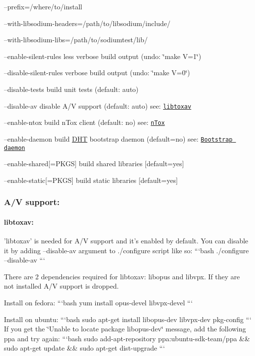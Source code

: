 \begin{DoxyItemize}
\item --prefix=/where/to/install
\item --with-\/libsodium-\/headers=/path/to/libsodium/include/
\item --with-\/libsodium-\/libs=/path/to/sodiumtest/lib/
\item --enable-\/silent-\/rules less verbose build output (undo\+: \char`\"{}make V=1\char`\"{})
\item --disable-\/silent-\/rules verbose build output (undo\+: \char`\"{}make V=0\char`\"{})
\item --disable-\/tests build unit tests (default\+: auto)
\item --disable-\/av disable A/\+V support (default\+: auto) see\+: \href{#libtoxav}{\tt libtoxav}
\item --enable-\/ntox build n\+Tox client (default\+: no) see\+: \href{#ntox}{\tt n\+Tox}
\item --enable-\/daemon build \hyperlink{struct_d_h_t}{D\+H\+T} bootstrap daemon (default=no) see\+: \href{#bootstrapd}{\tt Bootstrap daemon}
\item --enable-\/shared\mbox{[}=P\+K\+G\+S\mbox{]} build shared libraries \mbox{[}default=yes\mbox{]}
\item --enable-\/static\mbox{[}=P\+K\+G\+S\mbox{]} build static libraries \mbox{[}default=yes\mbox{]}
\end{DoxyItemize}

\label{_av}%
 \subsubsection*{A/\+V support\+:}

\label{_libtoxav}%
 \paragraph*{libtoxav\+:}

'libtoxav' is needed for A/\+V support and it's enabled by default. You can disable it by adding --disable-\/av argument to ./configure script like so\+: ```bash ./configure --disable-\/av ```

There are 2 dependencies required for libtoxav\+: libopus and libvpx. If they are not installed A/\+V support is dropped.

Install on fedora\+: ```bash yum install opus-\/devel libvpx-\/devel ```

Install on ubuntu\+: ```bash sudo apt-\/get install libopus-\/dev libvpx-\/dev pkg-\/config ``` If you get the \char`\"{}\+Unable to locate package libopus-\/dev\char`\"{} message, add the following ppa and try again\+: ```bash sudo add-\/apt-\/repository ppa\+:ubuntu-\/sdk-\/team/ppa \&\& sudo apt-\/get update \&\& sudo apt-\/get dist-\/upgrade ```

